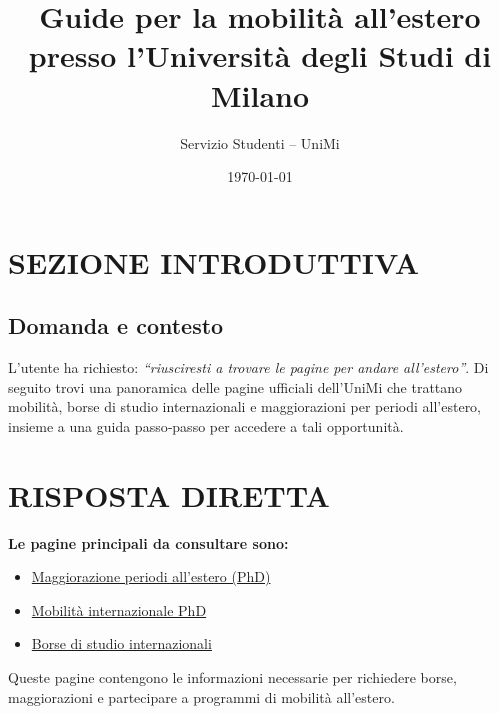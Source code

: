 \documentclass{article}
\title{Guide per la mobilità all’estero presso l’Università degli Studi di Milano}
\author{Servizio Studenti – UniMi}
\date{\today}
\begin{document}
\maketitle

\section{SEZIONE INTRODUTTIVA}
\subsection{Domanda e contesto}
L’utente ha richiesto: \textit{``riusciresti a trovare le pagine per andare all’estero''}.  
Di seguito trovi una panoramica delle pagine ufficiali dell’UniMi che trattano mobilità, borse di studio internazionali e maggiorazioni per periodi all’estero, insieme a una guida passo‑passo per accedere a tali opportunità.

\section{RISPOSTA DIRETTA}
\textbf{Le pagine principali da consultare sono:}
\begin{itemize}
    \item \href{https://www.unimi.it/it/studiare/frequentare-un-corso-post-laurea/dottorati-di-ricerca-phd/borse-e-tasse/maggiorazione-periodi-allestero}{Maggiorazione periodi all’estero (PhD)}  
    \item \href{https://www.unimi.it/it/studiare/frequentare-un-corso-post-laurea/dottorati-di-ricerca-phd/mobilita-internazionale-phd}{Mobilità internazionale PhD}  
    \item \href{https://www.unimi.it/it/studiare/borse-premi-mense-e-alloggi/borse-di-studio-internazionali}{Borse di studio internazionali}
\end{itemize}
Queste pagine contengono le informazioni necessarie per richiedere borse, maggiorazioni e partecipare a programmi di mobilità all’estero.
\end{document}

